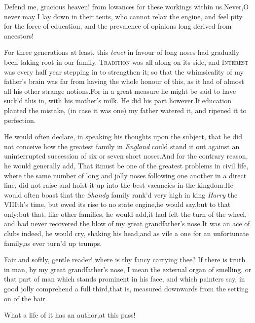 \documentclass{article}
\begin{document}
Defend me, gracious heaven! from 
lowances for these workings within us.\tsk Never,\tsk O never may I lay down in their
tents, who cannot relax the engine, and feel pity for the force of
education, and the prevalence of opinions long derived from
ancestors!

For three generations at least, this \textit{tenet} in favour of
long noses had gradually been taking root in our family.\tsh
\textsc{Tradition} was all along on its side, and
\textsc{Interest} was every half year stepping in to strengthen
it; so that the whimsicality of my father’s brain was far
from
having the whole honour of this, as it had of almost all his
other strange notions.\tsk For in a great measure he might be
said to have suck’d this in, with his mother’s milk. He did his
part however.\tsh If\break
education planted the mistake, (in case it was one) my father
watered it, and ri\-pened it to perfection.

He would often declare, in speaking his thoughts upon the
subject, that he did not conceive how the greatest family in
\textit{England} could stand it out against an uninterrupted
succession of six or seven short noses.\tsk And for the contrary
reason, he would generally add, That it\break must be one of
the greatest problems in civil life, where the same number of long
and jolly noses following one another in a direct line, did not
raise and hoist it up into the best vacancies in the
kingdom.\tsh He would often boast that the \textit{Shandy}
family rank’d very high in king \textit{Harry} the
VIIIth’s time, but owed its rise to no state engine,\tsk he
would say,\tsk but to that only;\tsh but that, like other
families, he would add,\tsh it had felt the turn of the
wheel, and had never recovered the blow of my
great grandfather’s nose.\tsh It was an ace of clubs
indeed, he would cry, shaking his head,\tsk and as vile a one for
an unfortunate family,\break as ever turn’d up trumps.

\tsh Fair and softly, gentle reader!\break
\tsh where is thy fancy carrying thee?\break
\tsh If there is truth in man, by my
great grandfather’s nose, I mean the external organ of smelling,
or that part of man which stands prominent in his
face,
\tsk and which painters say, in good jolly\break
{}\break
comprehend a full third,\tsh that is, measured
downwards from the setting on of the hair.\tsh

\tsh What a life of it has an author,\break at this pass!
\end{document}
